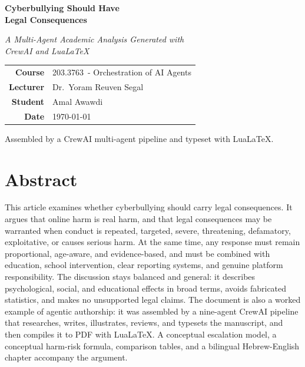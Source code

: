 \documentclass[11pt,a4paper]{report}
\newcommand{\coursenumber}{203.3763}
\newcommand{\coursename}{Orchestration of AI Agents}
\newcommand{\lecturername}{Dr.\ Yoram Reuven Segal}
\newcommand{\studentname}{Amal Awawdi}
\begin{document}
\begin{titlepage}
  \centering
  \vspace*{1.6cm}
  {\Huge\bfseries Cyberbullying Should Have\\[0.3em]
    Legal Consequences\par}
  \vspace{0.7cm}
  {\Large\itshape A Multi-Agent Academic Analysis Generated with\\[0.2em]
    CrewAI and LuaLaTeX\par}
  \vspace{2cm}
  \begin{tabular}{rl}
    \textbf{Course}   & \coursenumber\ - \coursename \\[0.4em]
    \textbf{Lecturer} & \lecturername \\[0.4em]
    \textbf{Student}  & \studentname \\[0.4em]
    \textbf{Date}     & \today \\
  \end{tabular}
  \vfill
  {\small Assembled by a CrewAI multi-agent pipeline and typeset with LuaLaTeX.\par}
\end{titlepage}

\chapter*{Abstract}
This article examines whether cyberbullying should carry legal consequences.
It argues that online harm is real harm, and that legal consequences may be
warranted when conduct is repeated, targeted, severe, threatening,
defamatory, exploitative, or causes serious harm. At the same time, any
response must remain proportional, age-aware, and evidence-based, and must be
combined with education, school intervention, clear reporting systems, and
genuine platform responsibility. The discussion stays balanced and general:
it describes psychological, social, and educational effects in broad terms,
avoids fabricated statistics, and makes no unsupported legal claims. The
document is also a worked example of agentic authorship: it was assembled by a
nine-agent CrewAI pipeline that researches, writes, illustrates, reviews, and
typesets the manuscript, and then compiles it to PDF with LuaLaTeX. A
conceptual escalation model, a conceptual harm-risk formula, comparison
tables, and a bilingual Hebrew-English chapter accompany the argument.
\end{document}
